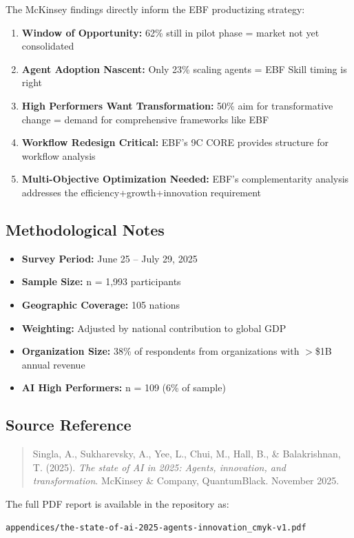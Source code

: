The McKinsey findings directly inform the EBF productizing strategy:

\begin{enumerate}
\item \textbf{Window of Opportunity:} 62\% still in pilot phase = market not yet consolidated
\item \textbf{Agent Adoption Nascent:} Only 23\% scaling agents = EBF Skill timing is right
\item \textbf{High Performers Want Transformation:} 50\% aim for transformative change = demand for comprehensive frameworks like EBF
\item \textbf{Workflow Redesign Critical:} EBF's 9C CORE provides structure for workflow analysis
\item \textbf{Multi-Objective Optimization Needed:} EBF's complementarity analysis addresses the efficiency+growth+innovation requirement
\end{enumerate}


\subsection{Methodological Notes}

\begin{itemize}
\item \textbf{Survey Period:} June 25 -- July 29, 2025
\item \textbf{Sample Size:} n = 1,993 participants
\item \textbf{Geographic Coverage:} 105 nations
\item \textbf{Weighting:} Adjusted by national contribution to global GDP
\item \textbf{Organization Size:} 38\% of respondents from organizations with $>$\$1B annual revenue
\item \textbf{AI High Performers:} n = 109 (6\% of sample)
\end{itemize}


\subsection{Source Reference}

\begin{quote}
Singla, A., Sukharevsky, A., Yee, L., Chui, M., Hall, B., \& Balakrishnan, T. (2025). \textit{The state of AI in 2025: Agents, innovation, and transformation}. McKinsey \& Company, QuantumBlack. November 2025.
\end{quote}

The full PDF report is available in the repository as:

\texttt{appendices/the-state-of-ai-2025-agents-innovation\_cmyk-v1.pdf}

